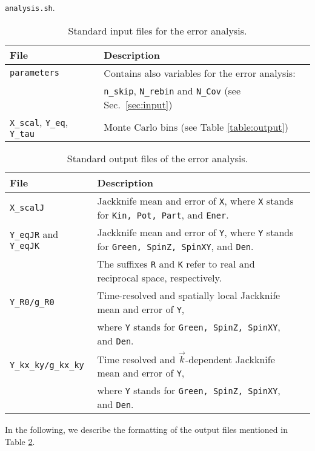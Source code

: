 \texttt{analysis.sh}.
%
\begin{table}[h]
   \begin{tabular}{@{} l l @{}}\toprule
   File & Description \\\midrule
   \texttt{parameters}  &  Contains also variables for the error analysis:\\
   & \texttt{n\_skip}, \texttt{N\_rebin} and \texttt{N\_Cov} (see Sec.~\ref{sec:input}) \\
   \texttt{X\_scal}, \texttt{Y\_eq}, \texttt{Y\_tau} & Monte Carlo bins (see Table \ref{table:output}) \\\bottomrule
    \end{tabular}
   \caption{Standard input files for the error analysis. \label{table:analysis_input}}
\end{table}
%
\begin{table}[h]
   \begin{tabular}{@{} l l l @{}}\toprule
   File & Description \\\midrule
   \texttt{X\_scalJ} & Jackknife mean and error of \texttt{X}, where  \texttt{X} stands for \texttt{Kin, Pot, Part}, and \texttt{Ener}.\\
   \texttt{Y\_eqJR} and \texttt{Y\_eqJK} & Jackknife mean and error of \texttt{Y}, where \texttt{Y} stands for \texttt{Green, SpinZ, SpinXY}, and \texttt{Den}.\\
   & The suffixes \texttt{R} and \texttt{K} refer to real and reciprocal space, respectively.\\
   \texttt{Y\_R0/g\_R0} & Time-resolved and spatially local Jackknife mean and error of \texttt{Y},\\
   & where \texttt{Y} stands for \texttt{Green, SpinZ, SpinXY}, and \texttt{Den}.\\
   \texttt{Y\_kx\_ky/g\_kx\_ky} & Time resolved and $\vec{k}$-dependent Jackknife mean and error of \texttt{Y},\\
   & where \texttt{Y} stands for \texttt{Green, SpinZ, SpinXY}, and \texttt{Den}.\\\bottomrule
    \end{tabular}
   \caption{ Standard output files of the error analysis. \label{table:analysis_output}}
\end{table}
%
In the following, we describe the formatting of the output files mentioned in Table \ref{table:analysis_output}.
